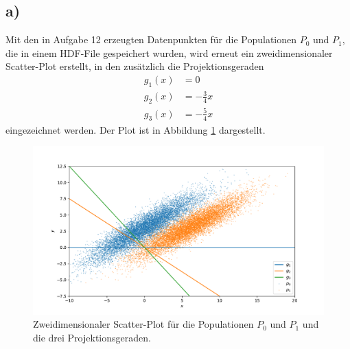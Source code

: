 \documentclass[a4paper, 11pt]{article}
\begin{document}
\subsection*{a)}
Mit den in Aufgabe 12 erzeugten Datenpunkten für die Populationen $P_0$ und $P_1$,
die in einem HDF-File gespeichert wurden, wird erneut ein zweidimensionaler
Scatter-Plot erstellt, in den zusätzlich die Projektionsgeraden
\begin{align*}
  g_1(x)&=0 \\
  g_2(x)&=-\frac{3}{4}x\\
  g_3(x)&=-\frac{5}{4}x
\end{align*}
eingezeichnet werden. Der Plot ist in Abbildung \ref{fig:populationen+geraden}
dargestellt.
\begin{figure}
  \centering
  \includegraphics[width=\textwidth]{../A13/A13a_scatter}
  \caption{Zweidimensionaler Scatter-Plot für die Populationen $P_0$ und $P_1$
  und die drei Projektionsgeraden.}
  \label{fig:populationen+geraden}
\end{figure}
\FloatBarrier
\end{document}
